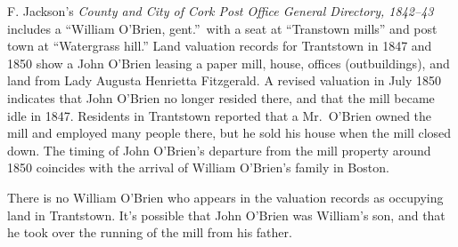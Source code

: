 F. Jackson's \textit{County and City of Cork Post Office General Directory, 1842--43} includes a ``William O'Brien, gent.''\ with a seat at ``Transtown mills'' and post town at ``Watergrass hill.''\citep{Jacksons} Land valuation records for Trantstown in 1847 and 1850 show a John O'Brien leasing a paper mill, house, offices (outbuildings), and land from Lady Augusta Henrietta Fitzgerald.\citep{Peramb1847,Peramb1850} A revised valuation in July 1850 indicates that John O'Brien no longer resided there, and that the mill became idle in 1847.\citep{House1850} Residents in Trantstown reported that a Mr.\ O'Brien owned the mill and employed many people there, but he sold his house when the mill closed down.\citep{PaperMill} The timing of John O'Brien's departure from the mill property around 1850 coincides with the arrival of William O'Brien's family in Boston.

There is no William O'Brien who appears in the valuation records as occupying land in Trantstown. It's possible that John O'Brien was William's son, and that he took over the running of the mill from his father.